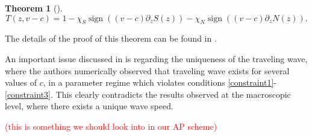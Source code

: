 \documentclass[11pt,twoside]{article}
\numberwithin{equation}{section}
\DeclareMathOperator{\sign}{sign}
\theoremstyle{plain}
\newtheorem{theorem}{Theorem}[section]
\theoremstyle{nonumberplain}
\begin{document}
\begin{theorem}[\cite{calvez2019chemotactic}]
\[
    T(z, v-c) = 1 - \chi_S \sign((v-c)\partial_zS(z)) - \chi_N \sign((v-c)\partial_zN(z)) .
\]

\end{theorem}
The details of the proof of this theorem can be found in \cite{calvez2019chemotactic}.

\noindent An important issue discussed in \cite{calvez2018well} is regarding the uniqueness of the traveling wave, where the authors numerically observed that traveling wave exists for several values of $c$, in a parameter regime which violates conditions \eqref{constraint1}-\eqref{constraint3}. This clearly contradicts the results observed at the macroscopic level, where there exists a unique wave speed.  

\textcolor{red}{(this is something we should look into in our AP scheme)}
\fi
\end{document}

